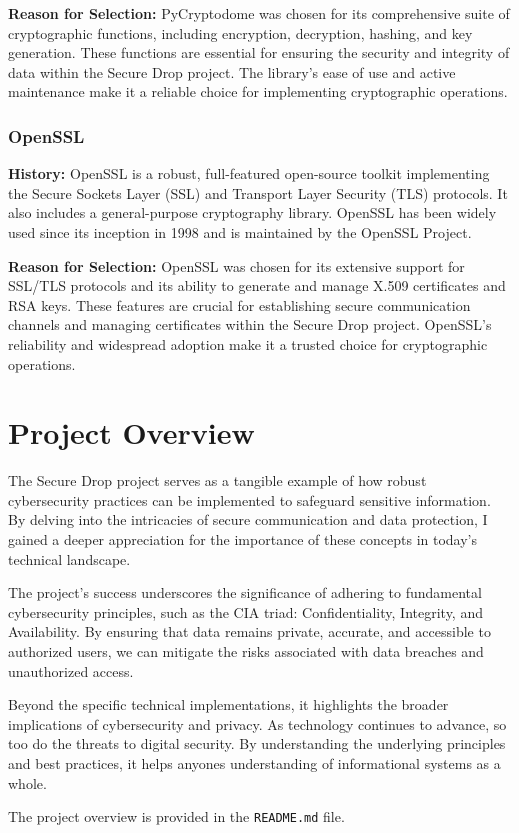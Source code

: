 \documentclass[12pt]{article}
\begin{document}
\textbf{Reason for Selection:} PyCryptodome was chosen for its comprehensive suite of cryptographic functions, including encryption, decryption, hashing, and key generation. These functions are essential for ensuring the security and integrity of data within the Secure Drop project. The library's ease of use and active maintenance make it a reliable choice for implementing cryptographic operations.

\subsubsection{OpenSSL}
\textbf{History:} OpenSSL is a robust, full-featured open-source toolkit implementing the Secure Sockets Layer (SSL) and Transport Layer Security (TLS) protocols. It also includes a general-purpose cryptography library. OpenSSL has been widely used since its inception in 1998 and is maintained by the OpenSSL Project.

\textbf{Reason for Selection:} OpenSSL was chosen for its extensive support for SSL/TLS protocols and its ability to generate and manage X.509 certificates and RSA keys. These features are crucial for establishing secure communication channels and managing certificates within the Secure Drop project. OpenSSL's reliability and widespread adoption make it a trusted choice for cryptographic operations.

\newpage

\section{Project Overview}

The Secure Drop project serves as a tangible example of how robust cybersecurity practices can be implemented to safeguard sensitive information. By delving into the intricacies of secure communication and data protection, I gained a deeper appreciation for the importance of these concepts in today's technical landscape.

The project's success underscores the significance of adhering to fundamental cybersecurity principles, such as the CIA triad: Confidentiality, Integrity, and Availability. By ensuring that data remains private, accurate, and accessible to authorized users, we can mitigate the risks associated with data breaches and unauthorized access.

Beyond the specific technical implementations, it highlights the broader implications of cybersecurity and privacy. As technology continues to advance, so too do the threats to digital security. By understanding the underlying principles and best practices, it helps anyones understanding of informational systems as a whole.

The project overview is provided in the \texttt{README.md} file.

\end{document}
